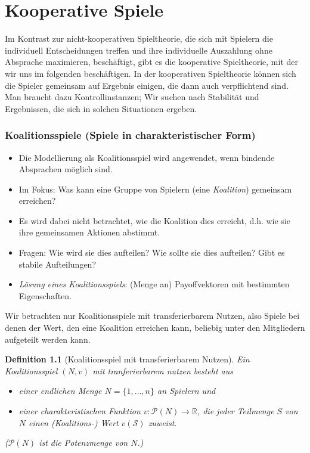 \documentclass[12pt]{extreport} %
\theoremstyle{named}
\theoremstyle{itshape}
\newtheorem*{definition}{Definition}
\theoremstyle{normal}
\begin{document}
\chapter{Kooperative Spiele} 


Im Kontrast zur nicht-kooperativen Spieltheorie, die sich mit Spielern die individuell Entscheidungen treffen und ihre individuelle Auszahlung ohne Absprache maximieren, beschäftigt, gibt es die kooperative Spieltheorie, mit der wir uns im folgenden beschäftigen. In der kooperativen Spieltheorie können sich die Spieler gemeinsam auf Ergebnis einigen, die dann auch verpflichtend sind. Man braucht dazu Kontrollinstanzen; Wir suchen nach Stabilität und Ergebnissen, die sich in solchen Situationen ergeben.

\subsection*{Koalitionsspiele (Spiele in charakteristischer Form)}
\begin{itemize}
	\item Die Modellierung als Koalitionsspiel wird angewendet, wenn bindende Absprachen möglich sind. 
	\item Im Fokus: Was kann eine Gruppe von Spielern (eine \textit{Koalition}) gemeinsam erreichen? 
	\item Es wird dabei nicht betrachtet, wie die Koalition dies erreicht, d.h. wie sie ihre gemeinsamen Aktionen abstimmt. 
	\item Fragen: Wie wird sie dies aufteilen? Wie sollte sie dies aufteilen? Gibt es stabile Aufteilungen? 
	\item \textit{Lösung eines Koalitionsspiels}: (Menge an) Payoffvektoren mit bestimmten Eigenschaften.
\end{itemize}

Wir betrachten nur Koalitionsspiele mit transferierbarem Nutzen, also Spiele bei denen der Wert, den eine Koalition erreichen kann, beliebig unter den Mitgliedern aufgeteilt werden kann.

\begin{definition}[Koalitionsspiel mit transferierbarem Nutzen]
	Ein Koalitionsspiel $(N, v)$ mit tranferierbarem nutzen besteht aus
	\begin{itemize}
		\item einer endlichen Menge $N = \{1, \dotsc, n\}$ an Spielern und
		\item einer charakteristischen Funktion $v \colon \mathcal{P}(N) \rightarrow \mathbb{R}$, die jeder Teilmenge $S$ von $N$ einen (Koalitions-) Wert $v(\mathcal{S})$ zuweist.
	\end{itemize}
	($\mathcal{P}(N)$ ist die Potenzmenge von $N$.)
\end{definition} 
\end{document}
